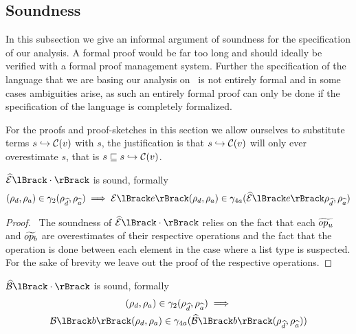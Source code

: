 \subsection{Soundness}\label{subsec:soundness}

In this subsection we give an informal argument of soundness for the specification of our analysis.
A formal proof would be far too long and should ideally be verified with a formal proof management system.
Further the specification of the language that we are basing our analysis on~\cite{halder_abstract_2012} is not entirely formal and in some cases ambiguities arise, as such an entirely formal proof can only be done if the specification of the language is completely formalized.

For the proofs and proof-sketches in this section we allow ourselves to substitute terms $s \hookrightarrow \mathcal{C}(v)$ with $s$, the justification is that $s \hookrightarrow \mathcal{C}(v)$ will only ever overestimate $s$, that is $s \sqsubseteq s \hookrightarrow \mathcal{C}(v)$.

\begin{conjecture}\label{thm:sound-exp}
    $\absexpsem{\cdot}$ is sound, formally
    \begin{equation*}
        (\rho_d, \rho_a) \in \concrete_2(\env{\ab{d}}, \env{\ab{a}}) \implies \expsem{e}(\rho_d, \rho_a) \in \concrete_{4a}(\absexpsem{e}\env{\ab{d}}, \env{\ab{a}})
    \end{equation*}
\end{conjecture}

\begin{proof}
    \pfsketch\
    The soundness of $\absexpsem{\cdot}$ relies on the fact that each $\widetilde{op_u}$ and $\widetilde{op_b}$ are overestimates of their respective operations and the fact that the operation is done between each element in the case where a list type is suspected.
    For the sake of brevity we leave out the proof of the respective operations.
\end{proof}


\begin{conjecture}\label{thm:sound-bool}
    $\absboolsem{\cdot}$ is sound, formally
    \begin{multline*}
        (\rho_d, \rho_a) \in \concrete_2(\env{\ab{d}}, \env{\ab{a}}) \implies \\
    \boolsem{b}(\rho_d, \rho_a) \in \concrete_{4a}(\absboolsem{b}(\env{\ab{d}}, \env{\ab{a}}))
    \end{multline*}
\end{conjecture}


